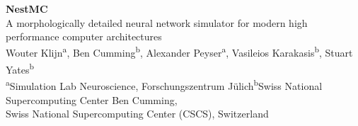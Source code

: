 \documentclass[a0paper,portrait]{baposter}
\newcommand{\julich}{J\"ulich\xspace}
\begin{document}
\begin{poster}
{
  \vspace{0.3\headerheight}
}
{ \Huge
  \textbf{NestMC} \\[0.1\baselineskip]
\large 
  A morphologically detailed neural network simulator for modern high performance computer architectures \\[0.2\baselineskip]
  \small
    Wouter Klijn\textsuperscript{a}, Ben Cumming\textsuperscript{b}, Alexander Peyser\textsuperscript{a}, Vasileios Karakasis\textsuperscript{b}, Stuart Yates\textsuperscript{b} \\
    \textsuperscript{a}Simulation Lab Neuroscience, Forschungszentrum \julich \hspace{2mm}\textsuperscript{b}Swiss National Supercomputing Center  %
}
{\small
    \vspace{1em} Ben Cumming, \\[0.5em]
    Swiss National Supercomputing Center (CSCS), Switzerland\\
}



\end{poster}
\end{document}
